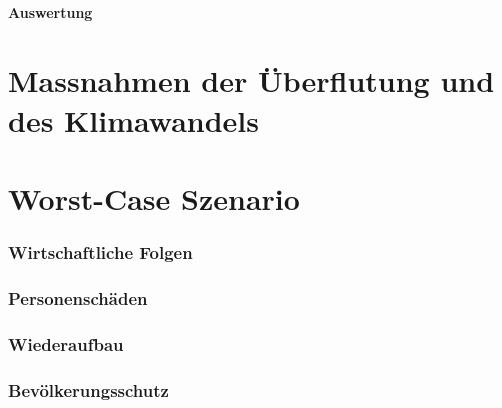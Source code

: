 \subsection{Auswertung}
 
\newpage
\part{Massnahmen der Überflutung und des Klimawandels}
 

\newpage

\part{Worst-Case Szenario}
\section{Wirtschaftliche Folgen}
\newpage
\section{Personenschäden}
\newpage
\section{Wiederaufbau}
\newpage
\section{Bevölkerungsschutz}


 